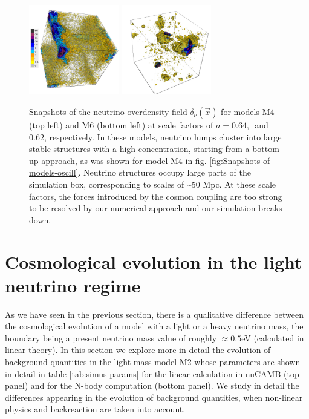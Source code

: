 \begin{figure}[H]
\begin{centering}
\includegraphics[width=0.35\textwidth]{Chapters/gnq/figures/model325-crash0062-1-leg}
\includegraphics[width=0.35\textwidth]{Chapters/gnq/figures/model5-crash065-1-noleg} 
\par\end{centering}
\caption[Snapshots of the neutrino
overdensity field for GNQ models M4
and M6.]{\label{fig:Snapshots-of-models-crashing}Snapshots of the neutrino
overdensity field $\delta_{\nu}(\vec{x})$ for models M4 (top left)
and M6 (bottom left) at scale factors of $a=0.64,\,$ and $0.62$,
respectively. In these models, neutrino lumps cluster into large stable
structures with a high concentration, starting from a bottom-up approach,
as was shown for model M4 in fig. \ref{fig:Snapshots-of-models-oscill}.
Neutrino structures occupy large parts of the simulation box, corresponding
to scales of \textasciitilde{}50 Mpc. At these scale factors, the
forces introduced by the cosmon coupling are too strong to be resolved
by our numerical approach and our simulation breaks down.}
\end{figure}



\section{Cosmological evolution in the light neutrino regime}

As we have seen in the previous section, there is a qualitative difference
between the cosmological evolution of a model with a light or a heavy
neutrino mass, the boundary being a present neutrino mass value of
roughly $\approx0.5$eV (calculated in linear theory). In this section
we explore more in detail the evolution of background quantities in
the light mass model M2 whose parameters are shown in detail in table
\ref{tab:simus-params} for the linear calculation in nuCAMB (top
panel) and for the N-body computation (bottom panel). We study in
detail the differences appearing in the evolution of background quantities,
when non-linear physics and backreaction are taken into account.

